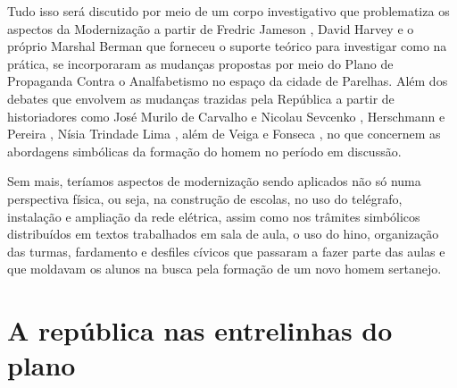 \begin{refsection}
Tudo isso será discutido por meio de um corpo investigativo que problematiza os aspectos da Modernização a partir de Fredric Jameson \citeyear{Jameson2005Modernidade}, David Harvey \citeyear{Harvey2002Condicao} e o próprio Marshal Berman \citeyear{Berman1986Tudo} que forneceu o suporte teórico para investigar como na prática, se incorporaram as mudanças propostas por meio do Plano de Propaganda Contra o Analfabetismo no espaço da cidade de Parelhas. Além dos debates que envolvem as mudanças trazidas pela República a partir de historiadores como José Murilo de Carvalho \citeyear{Carvalho1990Formacao} e Nicolau Sevcenko \citeyear{Sevcenko1998Preludio}, Herschmann e Pereira \citeyear{HerschmannAndPereira1994Invencao}, Nísia Trindade Lima \citeyear{Lima2013Sertao}, além de Veiga e Fonseca \citeyear{VeigaAndFonceca2003Historia}, no que concernem as abordagens simbólicas da formação do homem no período em discussão.

Sem mais, teríamos aspectos de modernização sendo aplicados não só numa perspectiva física, ou seja, na construção de escolas, no uso do telégrafo, instalação e ampliação da rede elétrica, assim como nos trâmites simbólicos distribuídos em textos trabalhados em sala de aula, o uso do hino, organização das turmas, fardamento e desfiles cívicos que passaram a fazer parte das aulas e que moldavam os alunos na busca pela formação de um novo homem sertanejo.

\section{A república nas entrelinhas do plano}


\end{refsection}
